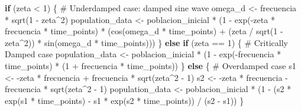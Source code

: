 \documentclass[
  12pt,
  letterpaper,
]{book}
\newenvironment{Shaded}{\begin{snugshade}}{\end{snugshade}}
\newcommand{\CommentTok}[1]{\textcolor[rgb]{0.37,0.37,0.37}{#1}}
\newcommand{\ControlFlowTok}[1]{\textcolor[rgb]{0.00,0.23,0.31}{\textbf{#1}}}
\newcommand{\DecValTok}[1]{\textcolor[rgb]{0.68,0.00,0.00}{#1}}
\newcommand{\FunctionTok}[1]{\textcolor[rgb]{0.28,0.35,0.67}{#1}}
\newcommand{\NormalTok}[1]{\textcolor[rgb]{0.00,0.23,0.31}{#1}}
\newcommand{\OtherTok}[1]{\textcolor[rgb]{0.00,0.23,0.31}{#1}}
\newcommand{\SpecialCharTok}[1]{\textcolor[rgb]{0.37,0.37,0.37}{#1}}
\begin{document}
\begin{Shaded}
\begin{Highlighting}[]
  \ControlFlowTok{if}\NormalTok{ (zeta }\SpecialCharTok{\textless{}} \DecValTok{1}\NormalTok{) \{}
    \CommentTok{\# Underdamped case: damped sine wave}
\NormalTok{    omega\_d }\OtherTok{\textless{}{-}}\NormalTok{ frecuencia }\SpecialCharTok{*} \FunctionTok{sqrt}\NormalTok{(}\DecValTok{1} \SpecialCharTok{{-}}\NormalTok{ zeta}\SpecialCharTok{\^{}}\DecValTok{2}\NormalTok{)}
\NormalTok{    population\_data }\OtherTok{\textless{}{-}}\NormalTok{ poblacion\_inicial }\SpecialCharTok{*}
\NormalTok{      (}\DecValTok{1} \SpecialCharTok{{-}}
        \FunctionTok{exp}\NormalTok{(}\SpecialCharTok{{-}}\NormalTok{zeta }\SpecialCharTok{*}\NormalTok{ frecuencia }\SpecialCharTok{*}\NormalTok{ time\_points) }\SpecialCharTok{*}
\NormalTok{          (}\FunctionTok{cos}\NormalTok{(omega\_d }\SpecialCharTok{*}\NormalTok{ time\_points) }\SpecialCharTok{+}
\NormalTok{            (zeta }\SpecialCharTok{/} \FunctionTok{sqrt}\NormalTok{(}\DecValTok{1} \SpecialCharTok{{-}}\NormalTok{ zeta}\SpecialCharTok{\^{}}\DecValTok{2}\NormalTok{)) }\SpecialCharTok{*} \FunctionTok{sin}\NormalTok{(omega\_d }\SpecialCharTok{*}\NormalTok{ time\_points)))}
\NormalTok{  \} }\ControlFlowTok{else} \ControlFlowTok{if}\NormalTok{ (zeta }\SpecialCharTok{==} \DecValTok{1}\NormalTok{) \{}
    \CommentTok{\# Critically Damped case}
\NormalTok{    population\_data }\OtherTok{\textless{}{-}}\NormalTok{ poblacion\_inicial }\SpecialCharTok{*}
\NormalTok{      (}\DecValTok{1} \SpecialCharTok{{-}} \FunctionTok{exp}\NormalTok{(}\SpecialCharTok{{-}}\NormalTok{frecuencia }\SpecialCharTok{*}\NormalTok{ time\_points) }\SpecialCharTok{*}\NormalTok{ (}\DecValTok{1} \SpecialCharTok{+}\NormalTok{ frecuencia }\SpecialCharTok{*}\NormalTok{ time\_points))}
\NormalTok{  \} }\ControlFlowTok{else}\NormalTok{ \{}
    \CommentTok{\# Overdamped case}
\NormalTok{    s1 }\OtherTok{\textless{}{-}} \SpecialCharTok{{-}}\NormalTok{zeta }\SpecialCharTok{*}\NormalTok{ frecuencia }\SpecialCharTok{+}\NormalTok{ frecuencia }\SpecialCharTok{*} \FunctionTok{sqrt}\NormalTok{(zeta}\SpecialCharTok{\^{}}\DecValTok{2} \SpecialCharTok{{-}} \DecValTok{1}\NormalTok{)}
\NormalTok{    s2 }\OtherTok{\textless{}{-}} \SpecialCharTok{{-}}\NormalTok{zeta }\SpecialCharTok{*}\NormalTok{ frecuencia }\SpecialCharTok{{-}}\NormalTok{ frecuencia }\SpecialCharTok{*} \FunctionTok{sqrt}\NormalTok{(zeta}\SpecialCharTok{\^{}}\DecValTok{2} \SpecialCharTok{{-}} \DecValTok{1}\NormalTok{)}
\NormalTok{    population\_data }\OtherTok{\textless{}{-}}\NormalTok{ poblacion\_inicial }\SpecialCharTok{*}
\NormalTok{      (}\DecValTok{1} \SpecialCharTok{{-}}
\NormalTok{        (s2 }\SpecialCharTok{*} \FunctionTok{exp}\NormalTok{(s1 }\SpecialCharTok{*}\NormalTok{ time\_points) }\SpecialCharTok{{-}}\NormalTok{ s1 }\SpecialCharTok{*} \FunctionTok{exp}\NormalTok{(s2 }\SpecialCharTok{*}\NormalTok{ time\_points)) }\SpecialCharTok{/}\NormalTok{ (s2 }\SpecialCharTok{{-}}\NormalTok{ s1))}
\NormalTok{  \}}


\end{Highlighting}
\end{Shaded}
\end{document}
